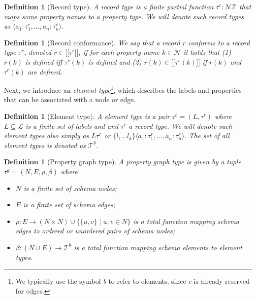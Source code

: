 \documentclass[a4paper]{article}
\makeatletter
\newtheorem{definition}[theorem]{Definition}
\newcommand{\N}{\mathbb{N}}
\newcommand{\ptypes}{\mathcal{T}}
\newcommand{\rtype}{\tau^r}
\newcommand{\btype}{\tau^b}
\newcommand{\btypes}{\mathcal{T}^b}
\newcommand{\gtype}{\tau^g}
\newcommand{\lsem}{\ensuremath{[\![}}
\newcommand{\rsem}{\ensuremath{]\!]}}
\newcommand{\sem}[1]{\ensuremath{\lsem #1 \rsem}}
\newcommand{\pto}{}%
\DeclareRobustCommand{\pto}{\mathrel{\mathpalette\p@to@gets\to}}
\newcommand{\p@to@gets}[2]{%
  \ooalign{\hidewidth$\m@th#1\mapstochar\mkern5mu$\hidewidth\cr$\m@th#1\to$\cr}%
}
\makeatother
\begin{document}
\begin{definition}[Record type]
  A \emph{record type} is a finite partial function $\rtype : \mathcal{N} \pto \ptypes$ that maps some property names to a property type. We will denote such record types as $\langle a_1 : \rtype_1, \ldots, a_n : \rtype_n \rangle$.
\end{definition}

\begin{definition}[Record conformance]
  We say that a record $r$ \emph{conforms} to a record type $\rtype$, denoted $r \in \sem{\rtype}$, if for each property name $k \in \mathcal{N}$ it holds that (1) $r(k)$ is defined iff $\rtype(k)$ is defined and (2) $r(k) \in \sem{\rtype(k)}$ if $r(k)$ and $\rtype(k)$ are defined.
\end{definition}

Next, we introduce an \emph{element type}\footnote{We typically use the symbol \emph{b} to refer to elements, since \emph{e} is already reserved for edges.}, which describes the labels and properties that can be associated with a node or edge.

\begin{definition}[Element type]
  A \emph{element type} is a pair $\btype = (L, \rtype)$ where $L \subseteq \mathcal{L}$ is a finite set of labels and and $\rtype$ a record type. We will denote such element types also simply as $L \rtype$ or $\{ l_1 \ldots l_k \} \langle a_1 : \rtype_1, \ldots, a_n : \rtype_n \rangle$. The set of all element types is denoted as $\btypes$.
\end{definition}

\begin{definition}[Property graph type]
  A \emph{property graph type} is given by a tuple $\gtype = (N, E, \rho, \beta)$ where 
  \begin{itemize}
    \item $N$ is a finite set of schema nodes;
    \item $E$ is a finite set of schema edges;
    \item $\rho : E \to (N \times N) \cup \{\{u, v\} \mid u, v \in N\}$ is a total function mapping schema edges to ordered or unordered pairs of schema nodes;
    \item $\beta : (N \cup E) \to \btypes$ is a total function mapping schema elements to element types.
  \end{itemize}
\end{definition}
\end{document}
